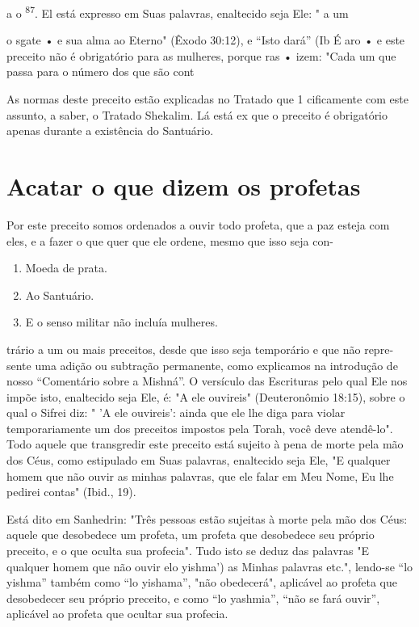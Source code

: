 a o \textsuperscript{87}. El está expresso em Suas palavras, enaltecido
seja Ele: " a um

o sgate • e sua alma ao Eterno" (Êxodo 30:12), e ``Isto dará'' (Ib É aro •
e este preceito não é obrigatório para as mulheres, porque ras • izem:
"Cada um que passa para o número dos que são cont

As normas deste preceito estão explicadas no Tratado que 1 cificamente
com este assunto, a saber, o Tratado Shekalim. Lá está ex que o preceito
é obrigatório apenas durante a existência do Santuário.


\section{Acatar o que dizem os profetas}


Por este preceito somos ordenados a ouvir todo profeta, que a paz esteja
com eles, e a fazer o que quer que ele ordene, mesmo que isso seja con-


\begin{enumerate}
\def\labelenumi{\arabic{enumi}.}
\setcounter{enumi}{185}
\item
 
 Moeda de prata.
 
\item
 
 Ao Santuário.
 
\item
 
 E o senso militar não incluía mulheres.
 
\end{enumerate}

trário a um ou mais preceitos, desde que isso seja temporário e que não
repre­sente uma adição ou subtração permanente, como explicamos na
introdução de nosso ``Comentário sobre a Mishná''. O versículo das
Escrituras pelo qual Ele nos impõe isto, enaltecido seja Ele, é: "A ele
ouvireis" (Deuteronômio 18:15), sobre o qual o Sifrei diz: " 'A ele
ouvireis': ainda que ele lhe diga para violar temporariamente um dos
preceitos impostos pela Torah, você deve atendê-lo". Todo aquele que
transgredir este preceito está sujeito à pena de morte pela mão dos
Céus, como estipulado em Suas palavras, enaltecido seja Ele, "E qualquer
homem que não ouvir as minhas palavras, que ele falar em Meu Nome, Eu
lhe pedirei contas" (Ibid., 19).

Está dito em Sanhedrin: "Três pessoas estão sujeitas à morte pela mão
dos Céus: aquele que desobedece um profeta, um profeta que desobedece
seu próprio preceito, e o que oculta sua profecia". Tudo isto se deduz
das palavras "E qualquer homem que não ouvir elo yishma') as Minhas
palavras etc.", lendo-se ``lo yishma'' também como ``lo yishama'', "não
obedecerá", aplicável ao pro­feta que desobedecer seu próprio preceito,
e como ``lo yashmia'', ``não se fará ouvir'', aplicável ao profeta que
ocultar sua profecia.


